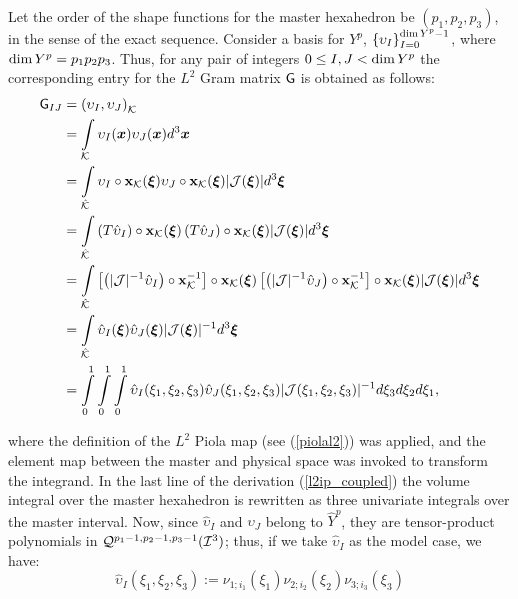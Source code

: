 Let the order of the shape functions for the master hexahedron be $(p_1,p_2,p_3)$, in the sense of the exact sequence. Consider a basis for $Y^p$, $\left\{ \upsilon_I \right\}_{I=0}^{\operatorname*{dim} Y^p-1}$, where $\operatorname*{dim} Y^p=p_1p_2p_3$. Thus, for any pair of integers $0\leq I,J<\operatorname*{dim} Y^p$ the corresponding entry for the $L^2$ Gram matrix $\mathsf{G}$ is obtained as follows:
% 
\begin{align}
                                  \mathsf{G}_{IJ}  &= \left(\upsilon_I,\upsilon_J\right)_{\mathcal{K}} \nonumber\\
                                        \ &= \int\limits_{\mathcal{K}}\upsilon_I(\boldsymbol{x})\upsilon_J(\boldsymbol{x})d^3\boldsymbol{x} \nonumber\\
                                        \ &= \int\limits_{\hat{\mathcal{K}}}\upsilon_I\circ\mathbf{x}_{\mathcal{K}}(\boldsymbol{\xi})\upsilon_J\circ\mathbf{x}_{\mathcal{K}}(\boldsymbol{\xi})|\mathcal{J}(\boldsymbol{\xi})|d^3\boldsymbol{\xi} \nonumber\\
                                        \ &= \int\limits_{\hat{\mathcal{K}}}\left(T\hat{\upsilon}_I\right)\circ\mathbf{x}_{\mathcal{K}}(\boldsymbol{\xi}) \left(T\hat{\upsilon}_J\right)\circ\mathbf{x}_{\mathcal{K}}(\boldsymbol{\xi})|\mathcal{J}(\boldsymbol{\xi})|d^3\boldsymbol{\xi} \nonumber\\
                                        \ &= \int\limits_{\hat{\mathcal{K}}}\left[\left(|\mathcal{J}|^{-1}\hat{\upsilon}_I\right)\circ\mathbf{x}_{\mathcal{K}}^{-1}\right]\circ\mathbf{x}_{\mathcal{K}}(\boldsymbol{\xi}) \left[\left(|\mathcal{J}|^{-1}\hat{\upsilon}_J\right)\circ\mathbf{x}_{\mathcal{K}}^{-1}\right]\circ\mathbf{x}_{\mathcal{K}}(\boldsymbol{\xi})|\mathcal{J}(\boldsymbol{\xi})|d^3\boldsymbol{\xi} \nonumber\\
                                        \ &= \int\limits_{\hat{\mathcal{K}}}\hat{\upsilon}_I(\boldsymbol{\xi})\hat{\upsilon}_J(\boldsymbol{\xi})|\mathcal{J}(\boldsymbol{\xi})|^{-1}d^3\boldsymbol{\xi} \nonumber\\
                                        \ &= \int\limits_0^1\int\limits_0^1\int\limits_0^1\hat{\upsilon}_I(\xi_1,\xi_2,\xi_3)
                                        \hat{\upsilon}_J(\xi_1,\xi_2,\xi_3)|\mathcal{J}(\xi_1,\xi_2,\xi_3)|^{-1}d\xi_3d\xi_2d\xi_1,
    \label{l2ip_coupled}
\end{align}

\noindent where the definition of the $L^2$ Piola map (see (\ref{piolal2})) was applied, and the element map between the master and physical space was invoked to transform the integrand. In the last line of the derivation (\ref{l2ip_coupled}) the volume integral over the master hexahedron is rewritten as three univariate integrals over the master interval. Now, since $\hat{\upsilon}_I $ and $ \hat{\upsilon}_J$ belong to $\hat{Y}^p$, they are tensor-product polynomials in $\mathcal{Q}^{p_1-1,p_2-1,p_3-1}(\mathcal{I}^3)$; thus, if we take $\hat{\upsilon}_I$ as the model case, we have:
% 
\begin{equation}
    \hat{\upsilon}_I(\xi_1,\xi_2,\xi_3):=\nu_{1;i_1}(\xi_1)\nu_{2;i_2}(\xi_2)\nu_{3;i_3}(\xi_3)
\end{equation}

